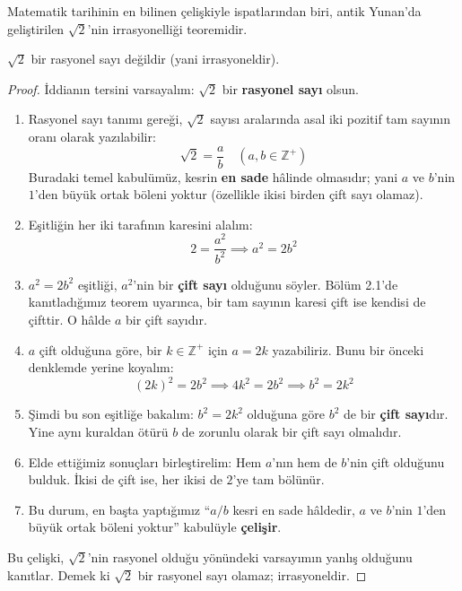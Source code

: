 Matematik tarihinin en bilinen çelişkiyle ispatlarından biri, antik Yunan'da geliştirilen $\sqrt{2}$'nin irrasyonelliği teoremidir.

\begin{theorem}
$\sqrt{2}$ bir rasyonel sayı değildir (yani irrasyoneldir).
\end{theorem}
\begin{proof}
İddianın tersini varsayalım: $\sqrt{2}$ bir \textbf{rasyonel sayı} olsun.
\begin{enumerate}
  \item Rasyonel sayı tanımı gereği, $\sqrt{2}$ sayısı aralarında asal iki pozitif tam sayının oranı olarak yazılabilir:
  \[ \sqrt{2} = \frac{a}{b} \quad (a, b \in \mathbb{Z}^+) \]
  Buradaki temel kabulümüz, kesrin \textbf{en sade} hâlinde olmasıdır; yani $a$ ve $b$'nin $1$'den büyük ortak böleni yoktur (özellikle ikisi birden çift sayı olamaz).
  
  \item Eşitliğin her iki tarafının karesini alalım:
  \[ 2 = \frac{a^2}{b^2} \implies a^2 = 2b^2 \]
  
  \item $a^2 = 2b^2$ eşitliği, $a^2$'nin bir \textbf{çift sayı} olduğunu söyler. Bölüm 2.1'de kanıtladığımız teorem uyarınca, bir tam sayının karesi çift ise kendisi de çifttir. O hâlde $a$ bir çift sayıdır.
  
  \item $a$ çift olduğuna göre, bir $k \in \mathbb{Z}^+$ için $a = 2k$ yazabiliriz. Bunu bir önceki denklemde yerine koyalım:
  \[ (2k)^2 = 2b^2 \implies 4k^2 = 2b^2 \implies b^2 = 2k^2 \]
  
  \item Şimdi bu son eşitliğe bakalım: $b^2 = 2k^2$ olduğuna göre $b^2$ de bir \textbf{çift sayı}dır. Yine aynı kuraldan ötürü $b$ de zorunlu olarak bir çift sayı olmalıdır.
  
  \item Elde ettiğimiz sonuçları birleştirelim:
  Hem $a$'nın hem de $b$'nin çift olduğunu bulduk. İkisi de çift ise, her ikisi de $2$'ye tam bölünür.
  
  \item Bu durum, en başta yaptığımız ``$a/b$ kesri en sade hâldedir, $a$ ve $b$'nin $1$'den büyük ortak böleni yoktur'' kabulüyle \textbf{çelişir}.
\end{enumerate}
Bu çelişki, $\sqrt{2}$'nin rasyonel olduğu yönündeki varsayımın yanlış olduğunu kanıtlar. Demek ki $\sqrt{2}$ bir rasyonel sayı olamaz; irrasyoneldir.
\end{proof}

